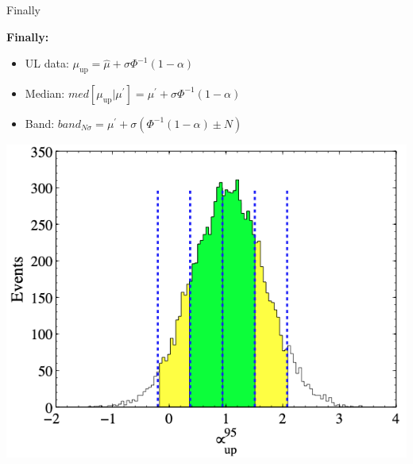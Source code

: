\documentclass[aspectratio=1610, 9pt]{beamer}
\begin{document}
\begin{frame}{Finally}
    \Large
    \centering
    \begin{minipage}{0.49\textwidth}
        \textbf{Finally:}
        \begin{itemize}
            \item UL data: $\mu_\text{up} = \hat{\mu} + \sigma\Phi^{-1}(1-\alpha)$
            \item Median: $med[\mu_\text{up}\vert\mu^\prime] = \mu^\prime + \sigma\Phi^{-1}(1-\alpha)$
            \item Band: $band_{N\sigma} = \mu^\prime + \sigma(\Phi^{-1}(1-\alpha)\pm N)$
        \end{itemize}
    \end{minipage}
    \hfill
    \begin{minipage}{0.5\textwidth}
        \includegraphics[width=\textwidth]{imgs/CL one mass.png}
    \end{minipage}
\end{frame}
\end{document}

